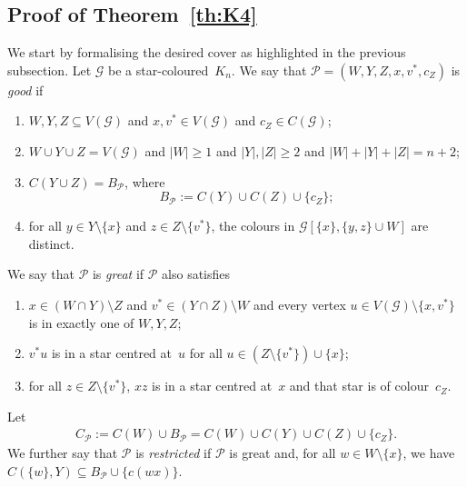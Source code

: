 \documentclass[a4paper, 12pt]{article}
\numberwithin{equation}{section}
\def\sm{{\setminus}}
\newcommand{\mc}[1]{\mathcal{#1}}
\newcommand{\ms}[1]{\mathscr{#1}}
\begin{document}
\subsection{Proof of Theorem~\ref{th:K4}}

We start by formalising the desired cover as highlighted in the previous subsection. 
Let $\ms{G}$ be a star-coloured~$K_n$. 
We say that $\mc{P} = (W,Y,Z,x,v^*,c_Z)$ is \emph{good} if 

\medskip
\begin{enumerate}[label = {\rm P${\arabic*}$:}, ref = {\rm P${\arabic*}$}]
	\item $W, Y, Z \subseteq V(\ms{G})$ and $x,v^* \in V(\ms{G})$ and $c_Z \in C(\ms{G})$; \label{itm:p:1}
	\item $W \cup Y \cup Z =  V(\ms{G})$ and $|W| \geq 1$ and $|Y|,|Z| \ge 2$ and $|W|+|Y|+|Z|=n+2$;\label{itm:p:2}
  \item $C(Y \cup Z) =  B_{\mc{P}}$, where
  $$
  B_{\mc{P}} := C(Y) \cup C(Z) \cup \{c_Z\};
  $$ \label{itm:p:3}
	\item for all $y \in Y \sm \{x\}$ and $z \in Z \sm \{v^*\}$,  the colours in $\ms{G}[\{x\},\{y,z\} \cup W]$ are distinct.\label{itm:p:4}
\end{enumerate}

\medskip
We say that $\mc{P}$ is \emph{great} if $\mc{P}$ also satisfies 

\medskip
\begin{enumerate}[label = {\rm P${\arabic*}$:}, ref = {\rm P${\arabic*}$}, resume]
 
 \item $x \in (W \cap Y) \sm Z$ and $v^* \in (Y \cap Z) \sm W$ and  every vertex $u \in V(\ms{G}) \setminus \{ x,v^*\}$ is in exactly one of $W,Y,Z$;
\label{itm:p:5}
	\item $v^*u$ is in a star centred at~$u$ for all $u \in (Z \setminus \{v^*\}) \cup \{x\}$; \label{itm:p:6}
	\item for all $z \in Z\setminus \{v^*\}$, $xz$ is in a star centred at~$x$ and that star is of colour~$c_Z$.
\label{itm:p:7}
\end{enumerate}

\medskip
Let 
\begin{align*}
	C_{\mc{P}} := C(W) \cup B_{\mc{P}} = C(W) \cup C(Y) \cup C(Z) \cup \{c_Z\}.
\end{align*}
We further say that $\mc{P}$ is \emph{restricted} if $\mc{P}$ is great and, for all $w \in W\sm\{x\}$, we have $C(\{w\},Y) \subseteq B_{\mc{P}} \cup \{c(wx)\}$.
\end{document}
